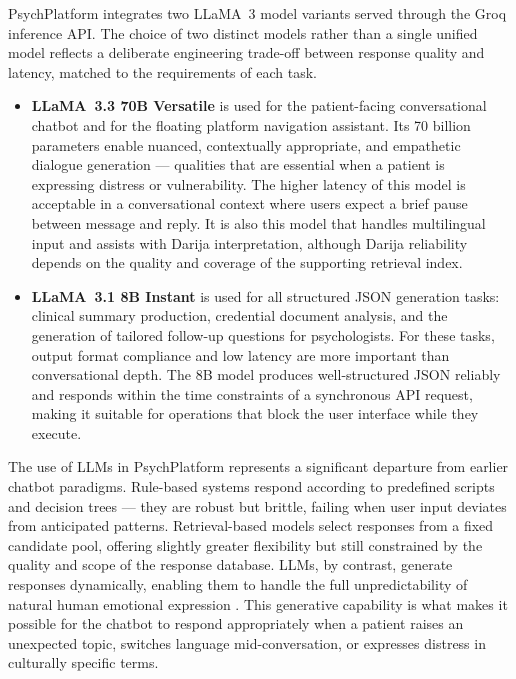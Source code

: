 \documentclass[a4paper,12pt]{report}
\begin{document}
PsychPlatform integrates two LLaMA~3 model variants served through the Groq inference API. The choice of two distinct models rather than a single unified model reflects a deliberate engineering trade-off between response quality and latency, matched to the requirements of each task.

\begin{itemize}[leftmargin=1.5em, itemsep=6pt]

  \item[--] \textbf{LLaMA~3.3 70B Versatile} is used for the patient-facing conversational chatbot and for the floating platform navigation assistant. Its 70 billion parameters enable nuanced, contextually appropriate, and empathetic dialogue generation --- qualities that are essential when a patient is expressing distress or vulnerability. The higher latency of this model is acceptable in a conversational context where users expect a brief pause between message and reply. It is also this model that handles multilingual input and assists with Darija interpretation, although Darija reliability depends on the quality and coverage of the supporting retrieval index.

  \item[--] \textbf{LLaMA~3.1 8B Instant} is used for all structured JSON generation tasks: clinical summary production, credential document analysis, and the generation of tailored follow-up questions for psychologists. For these tasks, output format compliance and low latency are more important than conversational depth. The 8B model produces well-structured JSON reliably and responds within the time constraints of a synchronous API request, making it suitable for operations that block the user interface while they execute.

\end{itemize}

The use of LLMs in PsychPlatform represents a significant departure from earlier chatbot paradigms. Rule-based systems respond according to predefined scripts and decision trees --- they are robust but brittle, failing when user input deviates from anticipated patterns. Retrieval-based models select responses from a fixed candidate pool, offering slightly greater flexibility but still constrained by the quality and scope of the response database. LLMs, by contrast, generate responses dynamically, enabling them to handle the full unpredictability of natural human emotional expression \cite{Brown2020}. This generative capability is what makes it possible for the chatbot to respond appropriately when a patient raises an unexpected topic, switches language mid-conversation, or expresses distress in culturally specific terms.
\clearpage
\end{document}
